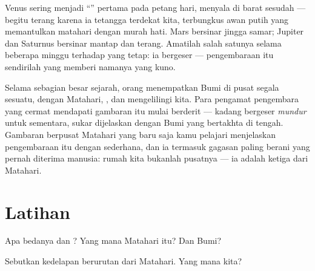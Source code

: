 \begin{example}\label{ex:g4:solar-system:wanderers}
Venus sering menjadi ``'' pertama pada petang hari, menyala di
barat sesudah  --- begitu terang karena ia tetangga
terdekat kita, terbungkus awan putih yang memantulkan  matahari
dengan murah hati. Mars bersinar jingga samar; Jupiter dan Saturnus
bersinar mantap dan terang. Amatilah salah satunya selama beberapa
minggu terhadap  yang tetap: ia bergeser --- pengembaraan itu
sendirilah yang memberi  namanya yang kuno.
\end{example}

\begin{remark}\label{rem:g4:solar-system:history}
Selama sebagian besar sejarah, orang menempatkan Bumi di pusat segala
sesuatu, dengan Matahari, , dan  mengelilingi kita. Para
pengamat pengembara yang cermat mendapati gambaran itu mulai berderit
---  kadang bergeser \emph{mundur} untuk sementara, sukar
dijelaskan dengan Bumi yang bertakhta di tengah. Gambaran berpusat
Matahari yang baru saja kamu pelajari menjelaskan pengembaraan itu
dengan sederhana, dan ia termasuk gagasan paling berani yang pernah
diterima manusia: rumah kita bukanlah pusatnya --- ia adalah 
ketiga dari Matahari.
\end{remark}

\section{Latihan}

\begin{exercise}[$\star$]\label{exo:g4:solar-system:1}
Apa bedanya  dan ? Yang mana Matahari itu? Dan Bumi?
\end{exercise}

\begin{exercise}[$\star$]\label{exo:g4:solar-system:2}
Sebutkan kedelapan  berurutan dari Matahari. Yang mana 
kita?
\end{exercise}

